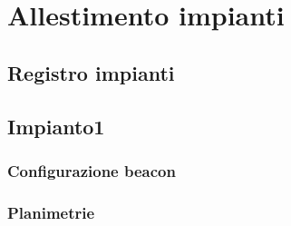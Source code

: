 \documentclass[../Sperimentazioni.tex]{subfiles}
\begin{document}
\section{Allestimento impianti}
\label{sec:AllestimentoImpianto}

	\subsection{Registro impianti}
	
	
	\subsection*{Impianto1}
		
		\subsubsection{Configurazione beacon}		
		
		\subsubsection{Planimetrie}
		
	
\end{document}
